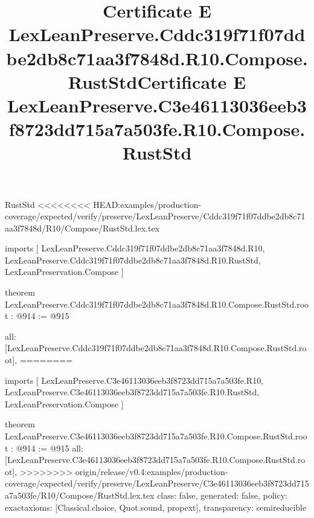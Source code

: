 \begin{lexlean}{RustStd}
<<<<<<<< HEAD:examples/production-coverage/expected/verify/preserve/LexLeanPreserve/Cddc319f71f07ddbe2db8c71aa3f7848d/R10/Compose/RustStd.lex.tex
\title{Certificate E LexLeanPreserve.Cddc319f71f07ddbe2db8c71aa3f7848d.R10.Compose.RustStd}
\begin{coremodule}
imports [
  LexLeanPreserve.Cddc319f71f07ddbe2db8c71aa3f7848d.R10,
  LexLeanPreserve.Cddc319f71f07ddbe2db8c71aa3f7848d.R10.RustStd,
  LexLeanPreservation.Compose
]

theorem LexLeanPreserve.Cddc319f71f07ddbe2db8c71aa3f7848d.R10.Compose.RustStd.root : @914 := @915 {
  all: [LexLeanPreserve.Cddc319f71f07ddbe2db8c71aa3f7848d.R10.Compose.RustStd.root],
========
\title{Certificate E LexLeanPreserve.C3e46113036eeb3f8723dd715a7a503fe.R10.Compose.RustStd}
\begin{coremodule}
imports [
  LexLeanPreserve.C3e46113036eeb3f8723dd715a7a503fe.R10,
  LexLeanPreserve.C3e46113036eeb3f8723dd715a7a503fe.R10.RustStd,
  LexLeanPreservation.Compose
]

theorem LexLeanPreserve.C3e46113036eeb3f8723dd715a7a503fe.R10.Compose.RustStd.root : @914 := @915 {
  all: [LexLeanPreserve.C3e46113036eeb3f8723dd715a7a503fe.R10.Compose.RustStd.root],
>>>>>>>> origin/release/v0.4:examples/production-coverage/expected/verify/preserve/LexLeanPreserve/C3e46113036eeb3f8723dd715a7a503fe/R10/Compose/RustStd.lex.tex
  class: false,
  generated: false,
  policy: exact{axioms: [Classical.choice, Quot.sound, propext]},
  transparency: semireducible
}


\end{coremodule}}
\end{coremodule}
\end{lexlean}
